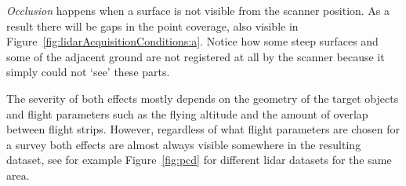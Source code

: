 \emph{Occlusion} happens when a surface is not visible from the scanner position.%
As a result there will be gaps in the point coverage, also visible in Figure~\ref{fig:lidarAcquisitionConditions:a}. 
Notice how some steep surfaces and some of the adjacent ground are not registered at all by the scanner because it simply could not `see' these parts.

The severity of both effects mostly depends on the geometry of the target objects and flight parameters such as the flying altitude and the amount of overlap between flight strips.
However, regardless of what flight parameters are chosen for a survey both effects are almost always visible somewhere in the resulting dataset, see for example Figure~\ref{fig:pcd} for different lidar datasets for the same area.


